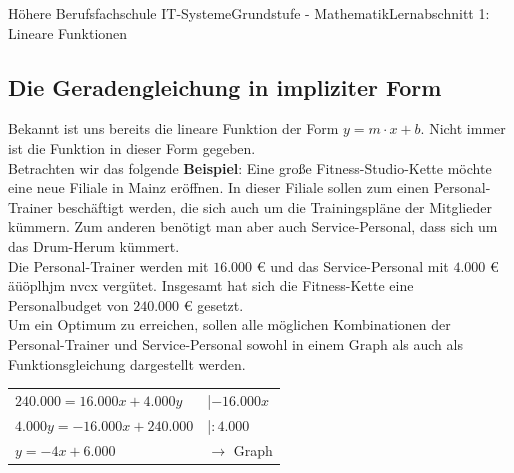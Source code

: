 \documentclass[11pt,twocolumn,oneside,openany,headings=optiontotoc,11pt,numbers=noenddot]{article}
\begin{document}
\begin{worksheet}{Höhere Berufsfachschule IT-Systeme}{Grundstufe - 
		Mathematik}{Lernabschnitt 1: Lineare Funktionen}
		\subsection{Die Geradengleichung in impliziter Form}
		Bekannt ist uns bereits die lineare Funktion der Form \(y=m\cdot{}x +b\). Nicht immer ist die Funktion in dieser Form gegeben.\\
		Betrachten wir das folgende \textbf{Beispiel}: Eine große Fitness-Studio-Kette möchte eine neue Filiale in Mainz eröffnen. In dieser Filiale sollen zum einen Personal-Trainer beschäftigt werden, die sich auch um die Trainingspläne der Mitglieder kümmern. Zum anderen benötigt man aber auch Service-Personal, dass sich um das Drum-Herum kümmert.\\
		Die Personal-Trainer werden mit \(16.000\) \euro{} und das Service-Personal mit \(4.000\) \euro{}
		äüöplhjm nvcx vergütet. Insgesamt hat sich die Fitness-Kette eine Personalbudget von \(240.000\) \euro{} gesetzt.\\
		Um ein Optimum zu erreichen, sollen alle möglichen Kombinationen der Personal-Trainer und Service-Personal sowohl in einem Graph als auch als Funktionsgleichung dargestellt werden.\\
		\par\noindent
		\begin{tabularx}{0.48\textwidth}{ll}
			\(240.000 = 16.000x + 4.000y\) & |\(-16.000x\)\\
			\(4.000y = -16.000x + 240.000\) & |\(:4.000\)\\
			\(y = -4x + 6.000\) & \(\rightarrow\) Graph
		\end{tabularx}
		\newpage

\end{worksheet}
\end{document}
